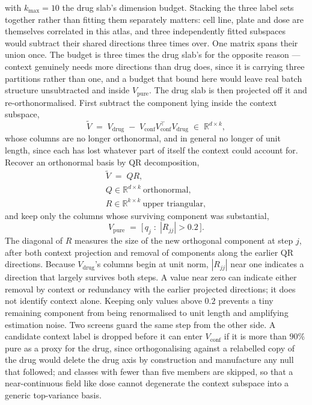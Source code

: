 with $k_{\max} = 10$ the drug slab's dimension budget. Stacking the three label
sets together rather than fitting them separately matters: cell line, plate and
dose are themselves correlated in this atlas, and three independently fitted
subspaces would subtract their shared directions three times over. One matrix
spans their union once. The budget is three times the drug slab's for the
opposite reason --- context genuinely needs more directions than drug does,
since it is carrying three partitions rather than one, and a budget that bound
here would leave real batch structure unsubtracted and inside
$V_{\textrm{pure}}$.
The drug slab is then projected off it and re-orthonormalised. First subtract
the component lying inside the context subspace,
\begin{equation}
  \widetilde{V} \;=\; V_{\textrm{drug}} \;-\;
    V_{\textrm{conf}} V_{\textrm{conf}}^{\top} V_{\textrm{drug}}
  \;\in\; \mathbb{R}^{d \times k},
\end{equation}
whose columns are no longer orthonormal, and in general no longer of unit
length, since each has lost whatever part of itself the context could account
for. Recover an orthonormal basis by QR decomposition,
\begin{equation}
\begin{gathered}
  \widetilde{V} \;=\; QR ,
  \\
  Q \in \mathbb{R}^{d \times k} \ \textrm{orthonormal},
  \\
  R \in \mathbb{R}^{k \times k} \ \textrm{upper triangular},
\end{gathered}
\end{equation}
and keep only the columns whose surviving component was substantial,
\begin{equation}
  V_{\textrm{pure}} \;=\; \big[\, q_j \;:\; |R_{jj}| > 0.2 \,\big].
\end{equation}
The diagonal of $R$ measures the size of the new orthogonal component at
step $j$, after both context projection and removal of components along the
earlier QR directions. Because $V_{\textrm{drug}}$'s columns begin at unit norm,
$|R_{jj}|$ near one indicates a direction that largely survives both steps.
A value near zero can indicate either removal by context or redundancy with
the earlier projected directions; it does not identify context alone. Keeping
only values above $0.2$ prevents a tiny remaining component from being
renormalised to unit length and amplifying estimation noise. Two screens guard the same step from the other side. A
candidate context label is dropped before it can enter $V_{\textrm{conf}}$ if
it is more than $90\%$ pure as a proxy for the drug, since orthogonalising
against a relabelled copy of the drug would delete the drug axis by
construction and manufacture any null that followed; and classes with fewer
than five members are skipped, so that a near-continuous field like dose cannot
degenerate the context subspace into a generic top-variance basis.


